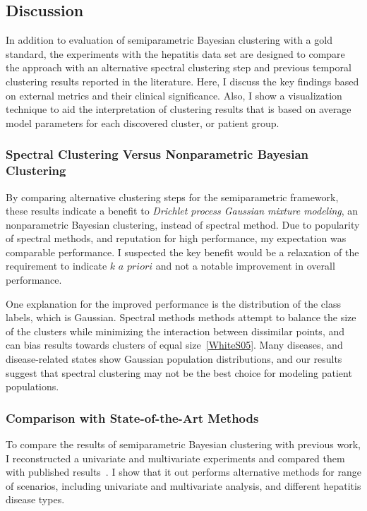 \subsection{Discussion}
In addition to evaluation of semiparametric Bayesian clustering with a gold standard, the experiments with the hepatitis data set are designed to compare the approach with an alternative spectral clustering step and previous temporal clustering results reported in the literature.  Here, I discuss the key findings based on external metrics and their clinical significance.  Also, I show a visualization technique to aid the interpretation of clustering results that is based on average model parameters for each discovered cluster, or patient group.

\subsubsection{Spectral Clustering Versus Nonparametric Bayesian Clustering}

 By comparing alternative clustering steps for the semiparametric framework, these results indicate a benefit to \emph{Drichlet process Gaussian mixture modeling}, an nonparametric Bayesian clustering, instead of spectral method.  Due to popularity of spectral methods, and reputation for high performance, my expectation was comparable performance.  I suspected the key benefit would be a relaxation of the requirement to indicate $k$ $a$ $priori$ and not a notable improvement in overall performance.

 One explanation for the improved performance is the distribution of the class labels, which is Gaussian.  Spectral methods methods attempt to balance the size of the clusters while minimizing the interaction between dissimilar points, and can bias results towards clusters of equal size~\ref{WhiteS05}.  Many diseases, and disease-related states show Gaussian population distributions, and our results suggest that spectral clustering may not be the best choice for modeling patient populations.

\subsubsection{Comparison with State-of-the-Art Methods}
To compare the results of semiparametric Bayesian clustering with previous work, I reconstructed a univariate and multivariate experiments and compared them with published results~\cite{Hirano05,Hirano07a,Hirano07b,Tsumoto12}.  I show that it out performs alternative methods for range of scenarios, including univariate and multivariate analysis, and different hepatitis disease types.

